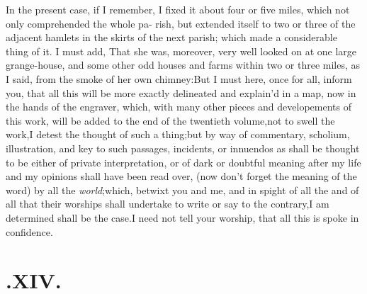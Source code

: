 \documentclass{article}
\begin{document}
In the present case, if I remember, I fixed it about four or
five miles, which not only comprehended the whole pa- rish, but
extended itself to two or three of the adjacent hamlets in the
skirts of the next parish; which made a considerable thing of it. I
must add, That she was, moreover, very well looked on at one large
grange-house, and some other odd houses and farms within two or
three miles, as I said, from the smoke of her own
chimney:\tsh  But I must here, once for all, inform you,
that all this will be more exactly delineated and explain’d
in a map, now in the hands of the engraver, which, with many other
pieces and developements of this work, will be added to the end of
the twentieth volume,\tsk  not to swell the work,\tsk  I detest
the thought of such a thing;\tsk  but by way of commentary,
scholium, illustration, and key to such passages, incidents, or
innuendos as shall be thought to be either of private
interpretation, or of dark or doubtful meaning after my life and
my opinions shall have been read over, (now don’t forget the
meaning of the word) by all the \textit{world};\tsh  which,
betwixt you and me, and in spight of all the\break 
{} and of all that their worships shall
under\-take to write or say to the contrary,\tsh\break  I am determined
shall be the case.\tsk  I need not tell your worship, that all
this is spoke in confidence.

\section{.\enspace XIV.}
\end{document}
